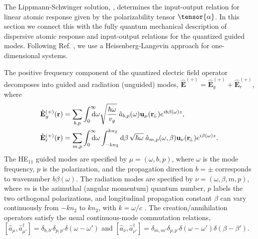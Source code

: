 \documentclass[preprint, aps,pra,onecolumn]{revtex4-1} %
\newcommand{\awg}{\hat{a}_{b,p}(\omega)}
\newcommand{\awr}{\hat{a}_{m,p}(\omega,\beta)}
\begin{document}
The Lippmann-Schwinger solution, , determines the input-output relation for linear atomic response given by the polarizability tensor $\tensor{\alpha}$.  
In this section we connect this with the fully quantum mechanical description of dispersive atomic response and input-output relations for the quantized guided modes.  
Following Ref. \cite{le_kien_spontaneous_2005}, we use a Heisenberg-Langevin approach for one-dimensional systems.  

The positive frequency component of the quantized electric field operator decomposes into guided and radiation (unguided) modes, $\hat{\mathbf{E}}^{(+)}=\hat{\mathbf{E}}_g^{(+)}+\hat{\mathbf{E}}_{r}^{(+)}$, where
\begin{subequations}
	\begin{align}
		\hat{\mathbf{E}}_g^{(+)}(\br) &= \sum_{b,p} \int_0^{\infty}\!\!\!\!\!  \mathrm{d}\omega \sqrt{\frac{ \hbar \omega}{ v_g}} \; \awg \mathbf{u}_\mu (\br\!_\perp) e^{i b\beta(\omega) z } ,\label{Eq::QuantizedElectricField} \\
		\hat{\mathbf{E}}_r^{(+)}(\br) &= \sum_{m,p}\int_0^{\infty}\!\!\!\!\! \mathrm{d}\omega   \int_{-kn_2}^{kn_2}\mathrm{d}\beta \, \sqrt{ \hbar \omega}\;\awr \mathbf{u}_\nu (\br\!_\perp) e^{i\beta(\omega) z }.
	\end{align}
\end{subequations}
The HE$_{11}$ guided modes are specified by $\mu =(\omega, b, p)$, where $\omega$ is the mode frequency,  $p$ is the polarization, and the propagation direction $b=\pm$ corresponds to wavenumber $b \beta (\omega)$.  The radiation modes are specified by  $\nu=(\omega, \beta, m, p)$, where $m$ is the azimuthal (angular momentum) quantum number, $p$ labels the two orthogonal polarizations, and longitudinal propagation constant $\beta$ can vary continuously from $-kn_2$ to $kn_2$, with $k = \omega/c$ \cite{sondergaard_general_2001,le_kien_spontaneous_2005}.  
The creation/annihilation operators satisfy the usual continuous-mode commutation relations, $[\hat{a}_\mu, \hat{a}^\dag_{\mu'} ] = \delta_{b,b'} \delta_{p,p'} \delta ( \omega - \omega ') $ and $[\hat{a}_\nu ,\hat{a}^\dag_{\nu'} ] = \delta_{m,m'} \delta_{p,p'} \delta ( \omega - \omega ')  \delta ( \beta - \beta') $.
\end{document}
